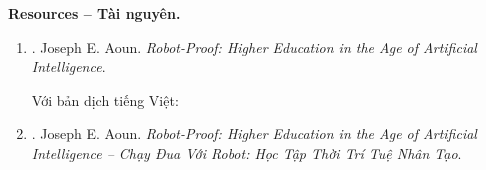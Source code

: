 \documentclass[12pt]{article}
\begin{document}
\noindent\textbf{\textsf{Resources -- Tài nguyên.}}
\begin{enumerate}
	\item \cite{Aoun_robot-proof}. {\sc Joseph E. Aoun}. {\it Robot-Proof: Higher Education in the Age of Artificial Intelligence}.
	
	Với bản dịch tiếng Việt:
	\item \cite{Aoun_robot-proof_VN}. {\sc Joseph E. Aoun}. {\it Robot-Proof: Higher Education in the Age of Artificial Intelligence -- Chạy Đua Với Robot: Học Tập Thời Trí Tuệ Nhân Tạo}.
\end{enumerate}

\begin{flushright}
	\musEighth[\href{https://www.youtube.com/watch?v=dIbeazAlxM4}{\small{\sc Chopin} {\it Ballade No. 1 in G Minor}}]\musEighth
\end{flushright}
\end{document}
